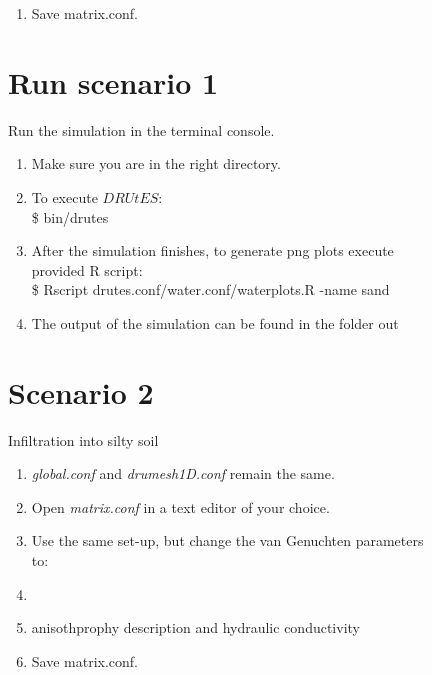 \documentclass[
10pt, %
a4paper, %
oneside, %
headinclude,footinclude, %
BCOR5mm, %
]{scrartcl}
\begin{document}
\begin{figure}[!h]
\begin{enumerate}
{\begin{tabular}{|c | c | c|c |}
		\hline
	\end{tabular}
}
\item Save matrix.conf.

\end{enumerate}

\section*{Run scenario 1}
Run the simulation in the terminal console.
\begin{enumerate}
\item Make sure you are in the right directory. 
\item To execute $DRUtES$: \\
\$ bin/drutes
\item After the simulation finishes, to generate png plots execute provided R script: \\
\$ Rscript drutes.conf/water.conf/waterplots.R -name sand
\item The output of the simulation can be found in the folder out
\end{enumerate}

\section*{Scenario 2}
Infiltration into silty soil
\begin{enumerate}
\item \emph{global.conf} and \emph{drumesh1D.conf} remain the same.
\item Open \emph{matrix.conf} in a text editor of your choice. 
\item Use the same set-up, but change the van Genuchten parameters to:
\item {}
\item anisothprophy description and hydraulic conductivity\\ 
\item Save matrix.conf.
\end{enumerate}


\end{figure}
\end{document}
